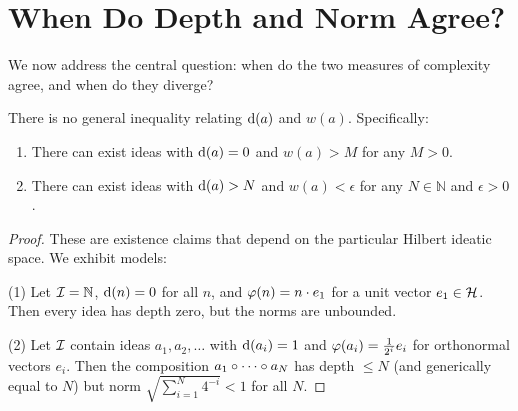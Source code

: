 \section{When Do Depth and Norm Agree?}

We now address the central question: when do the two measures of complexity
agree, and when do they diverge?

\begin{proposition}
\label{prop:no-relationship}
There is no general inequality relating $\operatorname{d}(a)$ and $w(a)$. Specifically:
\begin{enumerate}
\item There can exist ideas with $\operatorname{d}(a) = 0$ and $w(a) > M$ for any $M > 0$.
\item There can exist ideas with $\operatorname{d}(a) > N$ and $w(a) < \epsilon$ for any
$N \in \mathbb{N}$ and $\epsilon > 0$.
\end{enumerate}
\end{proposition}

\begin{proof}
These are existence claims that depend on the particular Hilbert ideatic space.
We exhibit models:

(1) Let $\mathcal{I} = \mathbb{N}$, $\operatorname{d}(n) = 0$ for all $n$, and
$\varphi(n) = n \cdot e_1$ for a unit vector $e_1 \in \mathcal{H}$. Then every
idea has depth zero, but the norms are unbounded.

(2) Let $\mathcal{I}$ contain ideas $a_1, a_2, \ldots$ with $\operatorname{d}(a_i) = 1$ and
$\varphi(a_i) = \frac{1}{2^i} e_i$ for orthonormal vectors $e_i$. Then the
composition $a_1 \circ \cdots \circ a_N$ has depth $\leq N$ (and
generically equal to $N$) but norm $\sqrt{\sum_{i=1}^N 4^{-i}} < 1$ for all
$N$.
\end{proof}


